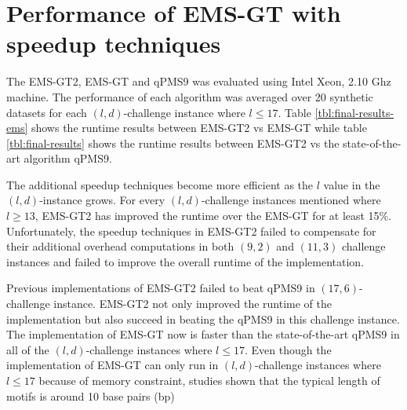 \section{Performance of EMS-GT with speedup techniques}








The EMS-GT2, EMS-GT and qPMS9 was evaluated using Intel Xeon, 2.10 Ghz machine. The performance of each algorithm was averaged over 20 synthetic datasets for each $(l, d)$-challenge instance where $l \leq 17$. Table \ref{tbl:final-results-ems} shows the runtime results between EMS-GT2 vs EMS-GT while table \ref{tbl:final-results} shows the runtime results between EMS-GT2 vs the state-of-the-art algorithm qPMS9.


The additional speedup techniques become more efficient as the $l$ value in the $(l, d)$-instance grows. For every $(l, d)$-challenge instances mentioned where $l \geq 13$, EMS-GT2 has improved the runtime over the EMS-GT for at least 15\%. Unfortunately, the speedup techniques in EMS-GT2 failed to compensate for their additional overhead computations in both $(9, 2)$ and $(11, 3)$ challenge instances and failed to improve the overall runtime of the implementation.


Previous implementations of EMS-GT2 failed to beat qPMS9 in $(17, 6)$-challenge instance. EMS-GT2 not only improved the runtime of the implementation but also succeed in beating the qPMS9 in this challenge instance. The implementation of EMS-GT now is faster than the state-of-the-art qPMS9 in all of the $(l, d)$-challenge instances where $l \leq 17$. Even though the implementation of EMS-GT can only run in $(l, d)$-challenge instances where $l \leq 17$ because of memory constraint, studies shown that the typical length of motifs is around 10 base pairs (bp) \cite{stewart2012transcription}





